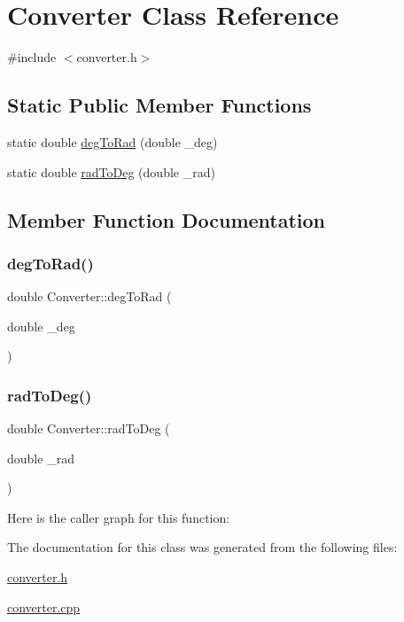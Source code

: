 \hypertarget{class_converter}{}\section{Converter Class Reference}
\label{class_converter}


{\ttfamily \#include $<$converter.\+h$>$}

\subsection*{Static Public Member Functions}
\begin{DoxyCompactItemize}
\item 
static double \mbox{\hyperlink{class_converter_abc1bf1133030330006a387c28460d7c8}{deg\+To\+Rad}} (double \+\_\+deg)
\item 
static double \mbox{\hyperlink{class_converter_ae2ec78dff109070d0107ae8a2c0beb4b}{rad\+To\+Deg}} (double \+\_\+rad)
\end{DoxyCompactItemize}


\subsection{Member Function Documentation}
\mbox{\label{class_converter_abc1bf1133030330006a387c28460d7c8}} 
\subsubsection{\texorpdfstring{deg\+To\+Rad()}{degToRad()}}
{\footnotesize\ttfamily double Converter\+::deg\+To\+Rad (\begin{DoxyParamCaption}\item[{double}]{\+\_\+deg }\end{DoxyParamCaption})\hspace{0.3cm}{\ttfamily [static]}}

\mbox{\label{class_converter_ae2ec78dff109070d0107ae8a2c0beb4b}} 
\subsubsection{\texorpdfstring{rad\+To\+Deg()}{radToDeg()}}
{\footnotesize\ttfamily double Converter\+::rad\+To\+Deg (\begin{DoxyParamCaption}\item[{double}]{\+\_\+rad }\end{DoxyParamCaption})\hspace{0.3cm}{\ttfamily [static]}}

Here is the caller graph for this function\+:


The documentation for this class was generated from the following files\+:\begin{DoxyCompactItemize}
\item 
\mbox{\hyperlink{converter_8h}{converter.\+h}}\item 
\mbox{\hyperlink{converter_8cpp}{converter.\+cpp}}\end{DoxyCompactItemize}
